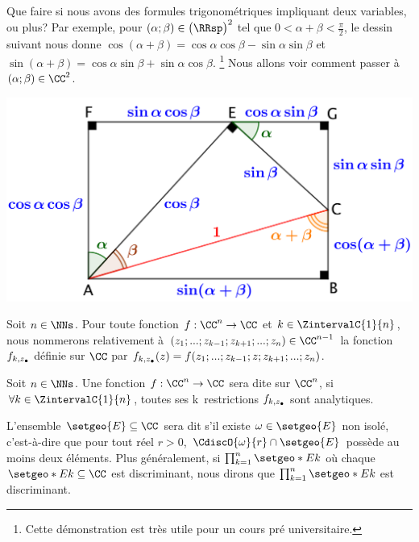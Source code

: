 Que faire si nous avons des formules trigonométriques impliquant deux variables, ou plus?
Par exemple,
pour
$(\alpha ; \beta) \in \big( \RRsp \big)^2$ tel que $0 < \alpha + \beta < \frac{\pi}{2}$,
le dessin suivant nous donne
$\cos(\alpha + \beta) = \cos \alpha \cos \beta - \sin \alpha \sin \beta$
et
$\sin(\alpha + \beta) = \cos \alpha \sin \beta + \sin \alpha \cos \beta$.%
\footnote{
    Cette démonstration est très utile pour un cours pré universitaire.
}
Nous allons voir comment passer à $(\alpha ; \beta) \in \CC^2$.


\begin{center}
	\includegraphics[scale=.7]{add-trigo-formulas.png}
\end{center}




\begin{defi}
    Soit $n \in \NNs$.
    Pour toute fonction $f: \CC^n \rightarrow \CC$
    et
    $k \in \ZintervalC{1}{n}$,
    nous nommerons  relativement à $(z_1 ; ... ; z_{k-1} ; z_{k+1} ; ... ; z_n) \in \CC^{n-1}$ 
    la fonction $f_{k , z_{\small\bullet}}$ définie sur $\CC$ par
    $f_{k , z_{\small\bullet}}(z) = f(z_1 ; ... ; z_{k-1} ; z ; z_{k+1} ; ... ; z_n)$.
\end{defi}


\begin{defi}
    Soit $n \in \NNs$.
    Une fonction $f: \CC^n \rightarrow \CC$ sera dite  sur $\CC^n$,
    si $\forall k \in \ZintervalC{1}{n}$,
    toutes ses k\iemes\ restrictions $f_{k , z_{\small\bullet}}$ sont analytiques.
\end{defi}


\begin{defi}
    L'ensemble $\setgeo{E} \subseteq \CC$ sera dit  
    s'il existe $\omega \in \setgeo{E}$ non isolé,
    c'est-à-dire
    que pour tout réel $r > 0$,
    $\CdiscO{\omega}{r} \cap \setgeo{E}$ possède au moins deux éléments.
    Plus généralement,
    si $\prod_{k=1}^{n} \setgeo*{E}{k}$ où chaque $\setgeo*{E}{k} \subseteq \CC$ est discriminant,
    nous dirons que
    $\prod_{k=1}^{n} \setgeo*{E}{k}$ est discriminant.
\end{defi}


